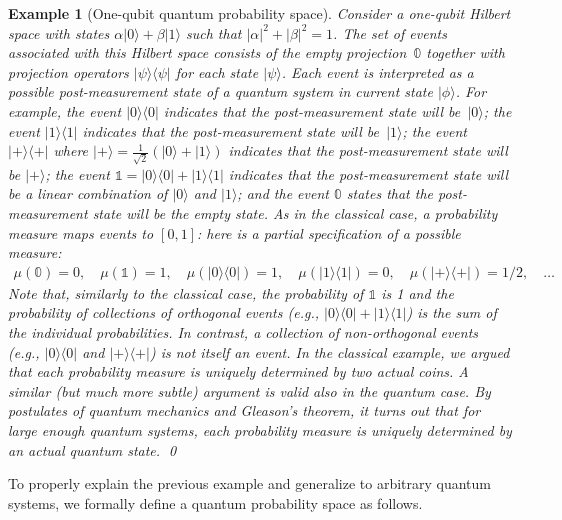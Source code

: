 \documentclass{article}
\theoremstyle{indented}
\newtheorem{example}{Example}
\newcommand{\ket}[1]{|#1\rangle}
\newcommand{\proj}[1]{|#1 \rangle\langle #1 |}
\newcommand{\ps}{\texttt{+}}
\theoremstyle{plain}
\theoremstyle{plain}
\begin{document}
\begin{example}[One-qubit quantum probability space] 
  Consider a one-qubit Hilbert space with states
  $\alpha \ket{0} + \beta \ket{1}$ such that
  $|\alpha|^2 + |\beta|^2 = 1$. The set of events associated with this
  Hilbert space consists of the empty projection~$\mathbb{0}$ together 
  with projection operators $\proj{\psi}$ for each state $\ket{\psi}$.
  Each event is interpreted as a possible post-measurement state of a
  quantum system in current state $\ket{\phi}$. For example, the event
  $\proj{0}$ indicates that the post-measurement state will
  be~$\ket{0}$; the event $\proj{1}$ indicates that the
  post-measurement state will be~$\ket{1}$; the event $\proj{\ps}$
  where $\ket{\ps} = \frac{1}{\sqrt{2}}(\ket{0}+\ket{1})$ indicates
  that the post-measurement state will be $\ket{\ps}$; the event
  $\mathbb{1} = \proj{0}+\proj{1}$ indicates that the post-measurement
  state will be a linear combination of $\ket{0}$ and $\ket{1}$; and
  the event $\mathbb{0}$ states that the post-measurement state will
  be the empty state. As in the classical case, a probability measure
  maps events to $[0,1]$: here is a partial specification of a
  possible measure:
\[\begin{array}{rcl}
\mu\left(\mathbb{0}\right) = 0, \quad
\mu\left(\mathbb{1}\right) =  1, \quad
\mu\left(\proj{0}\right) = 1, \quad
\mu\left(\proj{1}\right) = 0, \quad
\mu\left(\proj{\ps}\right) = 1/2, \quad \ldots
\end{array}\]
Note that, similarly to the classical case, the probability of
$\mathbb{1}$ is 1 and the probability of collections of orthogonal
events (e.g., $\proj{0}+\proj{1}$) is the sum of the individual
probabilities. In contrast, a collection of non-orthogonal events
(e.g., $\proj{0}$ and $\proj{\ps}$) is not itself an event.
In the classical example, we argued that each probability measure is
uniquely determined by two actual coins. A similar (but much more
subtle) argument is valid also in the quantum case. By postulates of
quantum mechanics and Gleason's theorem, it turns out that for large
enough quantum systems, each probability measure is uniquely
determined by an actual quantum state.
\qed\end{example}

To properly explain the previous example and generalize to arbitrary
quantum systems, we formally define a quantum probability space as
follows.
\end{document}
